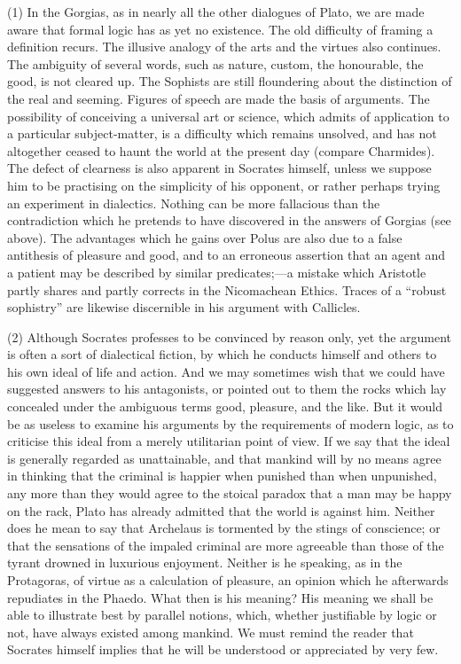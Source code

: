 \documentclass[11pt,letter]{article}
\begin{document}
\par  (1) In the Gorgias, as in nearly all the other dialogues of Plato, we are made aware that formal logic has as yet no existence. The old difficulty of framing a definition recurs. The illusive analogy of the arts and the virtues also continues. The ambiguity of several words, such as nature, custom, the honourable, the good, is not cleared up. The Sophists are still floundering about the distinction of the real and seeming. Figures of speech are made the basis of arguments. The possibility of conceiving a universal art or science, which admits of application to a particular subject-matter, is a difficulty which remains unsolved, and has not altogether ceased to haunt the world at the present day (compare Charmides). The defect of clearness is also apparent in Socrates himself, unless we suppose him to be practising on the simplicity of his opponent, or rather perhaps trying an experiment in dialectics. Nothing can be more fallacious than the contradiction which he pretends to have discovered in the answers of Gorgias (see above). The advantages which he gains over Polus are also due to a false antithesis of pleasure and good, and to an erroneous assertion that an agent and a patient may be described by similar predicates;—a mistake which Aristotle partly shares and partly corrects in the Nicomachean Ethics. Traces of a “robust sophistry” are likewise discernible in his argument with Callicles.

\par  (2) Although Socrates professes to be convinced by reason only, yet the argument is often a sort of dialectical fiction, by which he conducts himself and others to his own ideal of life and action. And we may sometimes wish that we could have suggested answers to his antagonists, or pointed out to them the rocks which lay concealed under the ambiguous terms good, pleasure, and the like. But it would be as useless to examine his arguments by the requirements of modern logic, as to criticise this ideal from a merely utilitarian point of view. If we say that the ideal is generally regarded as unattainable, and that mankind will by no means agree in thinking that the criminal is happier when punished than when unpunished, any more than they would agree to the stoical paradox that a man may be happy on the rack, Plato has already admitted that the world is against him. Neither does he mean to say that Archelaus is tormented by the stings of conscience; or that the sensations of the impaled criminal are more agreeable than those of the tyrant drowned in luxurious enjoyment. Neither is he speaking, as in the Protagoras, of virtue as a calculation of pleasure, an opinion which he afterwards repudiates in the Phaedo. What then is his meaning? His meaning we shall be able to illustrate best by parallel notions, which, whether justifiable by logic or not, have always existed among mankind. We must remind the reader that Socrates himself implies that he will be understood or appreciated by very few.
\end{document}
